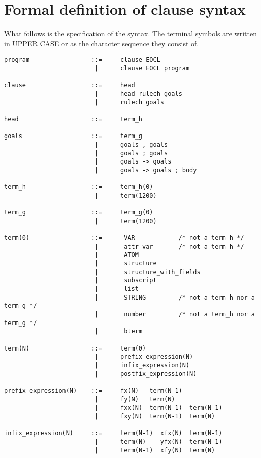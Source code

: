 \section{Formal definition of clause syntax}
What follows is the specification of the syntax. The terminal symbols are 
written in UPPER CASE or as the character sequence they consist of.
\begin{verbatim}
program                 ::=     clause EOCL
                         |      clause EOCL program

clause                  ::=     head
                         |      head rulech goals
                         |      rulech goals

head                    ::=     term_h

goals                   ::=     term_g
                         |      goals , goals
                         |      goals ; goals
                         |      goals -> goals
                         |      goals -> goals ; body

term_h                  ::=     term_h(0)
                         |      term(1200)

term_g                  ::=     term_g(0)
                         |      term(1200)

term(0)                 ::=      VAR            /* not a term_h */
                         |       attr_var       /* not a term_h */
                         |       ATOM
                         |       structure
                         |       structure_with_fields
                         |       subscript
                         |       list
                         |       STRING         /* not a term_h nor a term_g */
                         |       number         /* not a term_h nor a term_g */
                         |       bterm

term(N)                 ::=     term(0)
                         |      prefix_expression(N)
                         |      infix_expression(N)
                         |      postfix_expression(N)

prefix_expression(N)    ::=     fx(N)   term(N-1)
                         |      fy(N)   term(N)
                         |      fxx(N)  term(N-1)  term(N-1)
                         |      fxy(N)  term(N-1)  term(N)

infix_expression(N)     ::=     term(N-1)  xfx(N)  term(N-1)
                         |      term(N)    yfx(N)  term(N-1)
                         |      term(N-1)  xfy(N)  term(N)


\end{verbatim}
